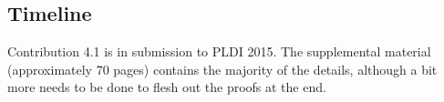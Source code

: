 

\subsection{Timeline}
Contribution 4.1 is in submission to PLDI 2015. The supplemental material (approximately 70 pages) contains the majority of the details, although a bit more needs to be done to flesh out the proofs at the end.



